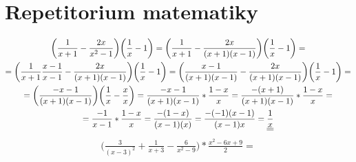 

 \section*{Repetitorium matematiky}


 \begin{gather*}
    \biggl( \frac{1}{x+1} - \frac{2x}{x^2-1} \biggr) \biggl(\frac{1}{x} - 1\biggr)
    =  \biggl( \frac{1}{ x+1} - \frac{2x}{(x+1)(x-1)}\biggr)\biggl(\frac{1}{x} -1 \biggr)
    = \\
    = \biggl( \frac{1}{x+1} \frac{x-1}{x-1} - \frac{2x}{(x+1)(x-1)} \biggr)  \biggl(\frac{1}{x}-1\biggr)
    = \biggl( \frac{x-1}{(x+1)(x-1)} - \frac{2x}{(x+1)(x-1)}\biggr) \biggl(\frac{1}{x} - 1\biggr) = 
    \\
    = \biggl(\frac{-x-1}{(x+1)(x-1)}\biggr)\biggl(\frac{1}{x} - \frac{x}{x}\biggr) 
    = \frac{-x-1}{(x+1)(x-1)}* \frac{1 - x}{x}
    = \frac{-(x+1)}{(x+1)(x-1)} * \frac{1-x}{x} =
    \\ = \frac{-1}{x-1} * \frac{1-x}{x} = \frac{-(1-x)}{(x-1)(x)} = \frac{-(-1)(x-1)}{(x-1)x} = \underline{\underline{\frac{1}{x}}}
\end{gather*}
\begin{gather*}
    \biggl( \frac{3}{(x-3)^2} + \frac{1}{x+3}- \frac{6}{x^2-9}\biggr) * \frac{x^2-6x+9}{2} =
\end{gather*}


